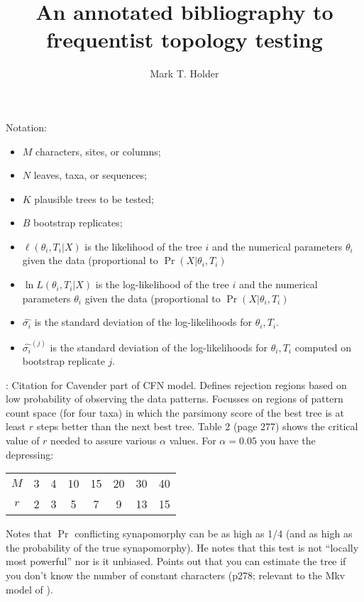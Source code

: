 \documentclass[11pt]{article}
\title{An annotated bibliography to frequentist topology testing}
\author{Mark T. Holder}
\newcommand{\sdLL}[1]{\hat{\sigma_{#1}}}
\newcommand{\sdLLBoot}[2]{\hat{\sigma_{#1}}^{(#2)}}
\newcommand{\like}{\ell}
\begin{document}
\maketitle

Notation:
\begin{itemize}
	\item $M$ characters, sites, or columns;
	\item $N$ leaves, taxa, or sequences;
	\item $K$ plausible trees to be tested;
	\item $B$ bootstrap replicates;
	\item $\like(\theta_i,T_i|X)$ is the likelihood of the tree $i$ and the numerical parameters $\theta_i$ given the data (proportional to $\Pr(X|\theta_i,T_i)$
	\item $\ln L(\theta_i,T_i|X)$ is the log-likelihood of the tree $i$ and the numerical parameters $\theta_i$ given the data (proportional to $\Pr(X|\theta_i,T_i)$
	\item $\sdLL{i}$ is the standard deviation of the log-likelihoods for $\theta_i,T_i$.
	\item $\sdLLBoot{i}{j}$ is the standard deviation of the log-likelihoods for $\theta_i,T_i$ computed on bootstrap replicate $j$.
\end{itemize}
	

\citet{Cavender1978}:  Citation for Cavender part of CFN model.  Defines rejection regions based on low probability of observing the data patterns.  Focusses on regions of pattern count space (for four taxa) in which the parsimony score of the best tree is at least $r$ steps better than the next best tree.  Table 2 (page 277) shows the critical value of $r$ needed to assure various $\alpha$ values.  For $\alpha= 0.05$ you have the depressing:
\begin{center}
\begin{tabular}{cccccccc}
$M$ & 3 & 4 & 10 & 15 & 20 & 30 & 40 \\
$r$ & 2 & 3 & 5 & 7 & 9 & 13 & 15 
\end{tabular}
\end{center}
Notes that $\Pr$ conflicting synapomorphy can be as high as 1/4 (and as high as the probability of the true synapomorphy).  He notes that this test is not ``locally most powerful'' nor is it unbiased. Points out that you can estimate the tree if you don't know the number of constant characters (p278; relevant to the Mkv model of \citep{Lewis2001}).
        
\end{document}
